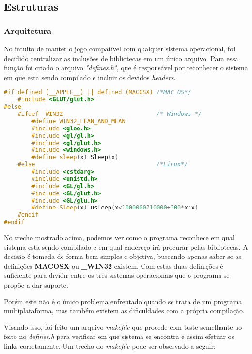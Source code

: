 
\subsection{Estruturas}\label{struct}

\subsubsection{Arquitetura}\label{arq}

No intuito de manter o jogo compatível com qualquer sistema operacional, foi decidido centralizar as inclusões de bibliotecas em um único arquivo. Para essa função foi criado o arquivo \textit{"defines.h"}, que é responsável por reconhecer o sistema em que esta sendo compilado e incluir os devidos \textit{headers}.

\begin{lstlisting}[language=C++,title=\textit{defines.h},firstnumber=5,numbers=none]
#if defined (__APPLE__) || defined (MACOSX) /*MAC OS*/
    #include <GLUT/glut.h>
#else
    #ifdef _WIN32                           /* Windows */
    	#define WIN32_LEAN_AND_MEAN
        #include <glee.h>
        #include <gl/gl.h>
		#include <gl/glut.h>
        #include <windows.h>
        #define sleep(x) Sleep(x)
    #else                                   /*Linux*/
    	#include <cstdarg>
    	#include <unistd.h>
        #include <GL/gl.h>
        #include <GL/glut.h>
        #include <GL/glu.h>
        #define Sleep(x) usleep(x<1000000?10000+300*x:x)
    #endif
#endif
\end{lstlisting}

No trecho mostrado acima, podemos ver como o programa reconhece em qual sistema esta sendo compilado e em qual endereço irá procurar pelas bibliotecas. A decisão é tomada de forma bem simples e objetiva, buscando apenas saber se as definições \textbf{MACOSX} ou \textbf{\_WIN32} existem. Com estas duas definições é suficiente para dividir entre os três sistemas operacionais que o programa se propõe a dar suporte. 

Porém este não é o único problema enfrentado quando se trata de um programa multiplataforma, mas também existem as dificuldades com a própria compilação.

Visando isso, foi feito um arquivo \textit{makefile} que procede com teste semelhante ao feito no \textit{defines.h} para verificar em que sistema se encontra e assim efetuar os links corretamente. Um trecho do \textit{makefile} pode ser observado a seguir:

